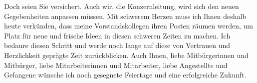 \documentclass[]{multiversum}
\begin{document}
Doch seien Sie versichert. Auch wir, die Konzernleitung, wird sich den
neuen Gegebenheiten anpassen müssen.
Mit schwerem Herzen muss ich Ihnen deshalb heute verkünden, dass meine Vorstandskollegen ihren Posten räumen werden, um
Platz für neue und frische Ideen in diesen schweren Zeiten zu machen.
Ich bedaure diesen Schritt und werde noch lange auf diese von Vertrauen
und Herzlichkeit geprägte Zeit zurückblicken.
Auch Ihnen, liebe Mitbürgerinnen und Mitbürger, liebe Mitarbeiterinnen
und Mitarbeiter, liebe Angestellte und Gefangene wünsche ich noch
gesegnete Feiertage und eine erfolgreiche Zukunft.

\impressum

%
%
\end{document}
